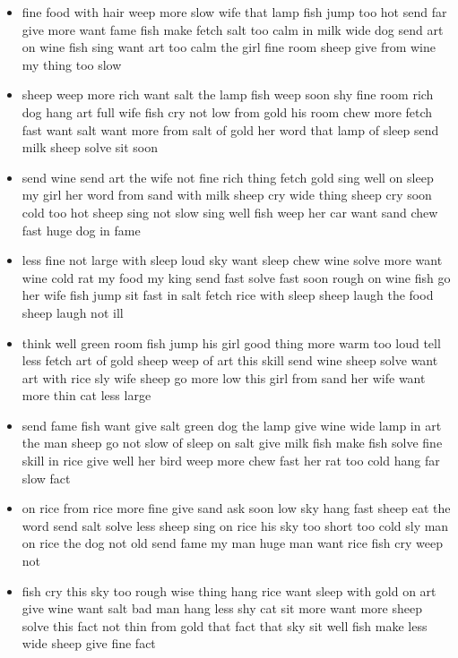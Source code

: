 \documentclass[10pt,letterpaper]{article}
\begin{document}
\begin{itemize}
  \item fine food with hair weep more slow wife that lamp fish jump
    too hot send far give more want fame fish make fetch salt too calm
    in milk wide dog send art on wine fish sing want art too calm the
    girl fine room sheep give from wine my thing too slow

  \item sheep weep more rich want salt the lamp fish weep soon shy
    fine room rich dog hang art full wife fish cry not low from gold
    his room chew more fetch fast want salt want more from salt of
    gold her word that lamp of sleep send milk sheep solve sit soon

  \item send wine send art the wife not fine rich thing fetch gold
    sing well on sleep my girl her word from sand with milk sheep cry
    wide thing sheep cry soon cold too hot sheep sing not slow sing
    well fish weep her car want sand chew fast huge dog in fame

  \item less fine not large with sleep loud sky want sleep chew wine
    solve more want wine cold rat my food my king send fast solve fast
    soon rough on wine fish go her wife fish jump sit fast in salt
    fetch rice with sleep sheep laugh the food sheep laugh not ill

  \item think well green room fish jump his girl good thing more warm
    too loud tell less fetch art of gold sheep weep of art this skill
    send wine sheep solve want art with rice sly wife sheep go more
    low this girl from sand her wife want more thin cat less large

  \item send fame fish want give salt green dog the lamp give wine
    wide lamp in art the man sheep go not slow of sleep on salt give
    milk fish make fish solve fine skill in rice give well her bird
    weep more chew fast her rat too cold hang far slow fact

  \item on rice from rice more fine give sand ask soon low sky hang
    fast sheep eat the word send salt solve less sheep sing on rice
    his sky too short too cold sly man on rice the dog not old send
    fame my man huge man want rice fish cry weep not

  \item fish cry this sky too rough wise thing hang rice want sleep
    with gold on art give wine want salt bad man hang less shy cat sit
    more want more sheep solve this fact not thin from gold that fact
    that sky sit well fish make less wide sheep give fine fact


\end{itemize}
\end{document}
